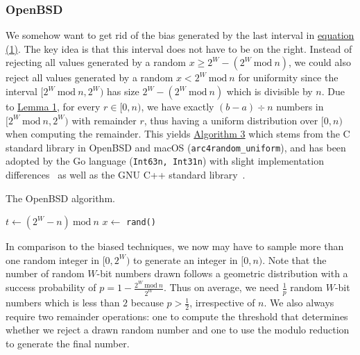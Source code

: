 \documentclass[a4paper, UKenglish, cleveref, autoref, thm-restate]{lipics-v2021}
\newcommand{\Mod}[1]{\ \mathrm{mod}\ #1}
\begin{document}
\subsubsection{OpenBSD}\label{sec:2.2.1}
We somehow want to get rid of the bias generated by the last interval in \hyperref[eq:1]{equation (1)}.
The key idea is that this interval does not have to be on the right.
Instead of rejecting all values generated by a random $x \geq 2^W - (2^W \Mod n)$, we could also reject all values generated by a random $x < 2^W \Mod n$ for uniformity since the interval $[2^W \Mod n, 2^W)$ has size $2^W - (2^W \Mod n)$ which is divisible by $n$.
Due to \hyperref[lemma:1]{Lemma 1}, for every $r \in [0,n)$, we have exactly $(b - a) \div n$ numbers in $[2^W \Mod n,2^W)$ with remainder $r$, thus having a uniform distribution over $[0,n)$ when computing the remainder.
This yields \hyperref[alg:openbsd]{Algorithm 3} which stems from the C standard library in OpenBSD and macOS (\texttt{arc4random\_uniform}), and has been adopted by the Go language (\texttt{Int63n, Int31n}) with slight implementation differences~\cite{GoLang} as well as the GNU C++ standard library~\cite{GnuCpp}.

\begin{algorithm}[!htb] \label{alg:openbsd}
    \caption{The OpenBSD algorithm.}
    \Require{source of uniformly-distributed random integers in $[0,2^W)$ given by \texttt{rand()}}
    $t \leftarrow \left(2^W - n\right) \Mod n$\tcc*[r]{$ \left(2^W - n\right) \Mod n \equiv 2^W \Mod n$}
    $x \leftarrow$ \texttt{rand()}\;
    \KwRet{$x \Mod n$}\;
\end{algorithm}

In comparison to the biased techniques, we now may have to sample more than one random integer in $[0,2^W)$ to generate an integer in $[0,n)$.
Note that the number of random $W$-bit numbers drawn follows a geometric distribution with a success probability of $p = 1 - \frac{2^W \Mod n}{2^W}$.
Thus on average, we need $\frac{1}{p}$ random $W$-bit numbers which is less than $2$ because $p > \frac{1}{2}$, irrespective of $n$.
We also always require two remainder operations: one to compute the threshold that determines whether we reject a drawn random number and one to use the modulo reduction to generate the final number.
\end{document}
